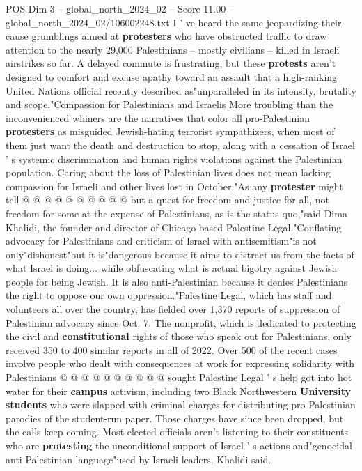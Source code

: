 \begin{textsample}{POS Dim 3 – global\_north\_2024\_02 – Score 11.00 – global\_north\_2024\_02/106002248.txt}
I ' ve heard the same jeopardizing-their-cause grumblings aimed at \textbf{protesters} who have obstructed traffic to draw attention to the nearly 29,000 Palestinians -- mostly civilians -- killed in Israeli airstrikes so far.
A delayed commute is frustrating, but these \textbf{protests} aren't designed to comfort and excuse apathy toward an assault that a high-ranking United Nations official recently described as"unparalleled in its intensity, brutality and scope."Compassion for Palestinians and Israelis More troubling than the inconvenienced whiners are the narratives that color all pro-Palestinian \textbf{protesters} as misguided Jewish-hating terrorist sympathizers, when most of them just want the death and destruction to stop, along with a cessation of Israel ' s systemic discrimination and human rights violations against the Palestinian population.
Caring about the loss of Palestinian lives does not mean lacking compassion for Israeli and other lives lost in October."As any \textbf{protester} might tell @ @ @ @ @ @ @ @ @ @ but a quest for freedom and justice for all, not freedom for some at the expense of Palestinians, as is the status quo,"said Dima Khalidi, the founder and director of Chicago-based Palestine Legal."Conflating advocacy for Palestinians and criticism of Israel with antisemitism"is not only"dishonest"but it is"dangerous because it aims to distract us from the facts of what Israel is doing... while obfuscating what is actual bigotry against Jewish people for being Jewish.
It is also anti-Palestinian because it denies Palestinians the right to oppose our own oppression."Palestine Legal, which has staff and volunteers all over the country, has fielded over 1,370 reports of suppression of Palestinian advocacy since Oct. 7.
The nonprofit, which is dedicated to protecting the civil and \textbf{constitutional} rights of those who speak out for Palestinians, only received 350 to 400 similar reports in all of 2022.
Over 500 of the recent cases involve people who dealt with consequences at work for expressing solidarity with Palestinians @ @ @ @ @ @ @ @ @ @ sought Palestine Legal ' s help got into hot water for their \textbf{campus} activism, including two Black Northwestern \textbf{University} \textbf{students} who were slapped with criminal charges for distributing pro-Palestinian parodies of the student-run paper.
Those charges have since been dropped, but the calls keep coming.
Most elected officials aren't listening to their constituents who are \textbf{protesting} the unconditional support of Israel ' s actions and"genocidal anti-Palestinian language"used by Israeli leaders, Khalidi said.

\end{textsample}
